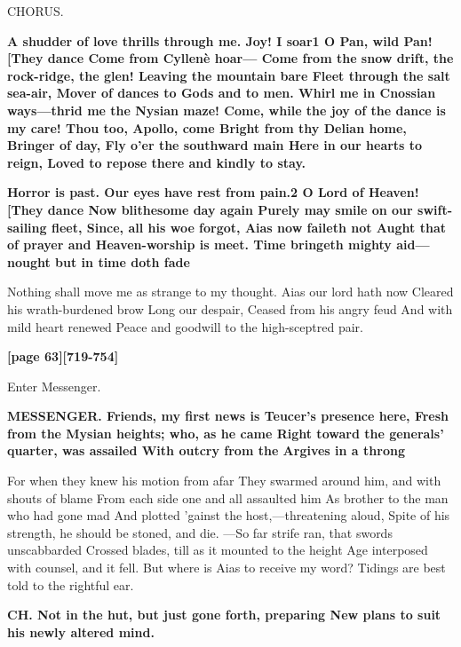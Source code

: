 \documentclass[11pt,letter]{book}
\begin{document}
\par  CHORUS.

\par \textbf{A shudder of love thrills through me. Joy! I soar1 O Pan, wild Pan![They dance Come from Cyllenè hoar— Come from the snow drift, the rock-ridge, the glen! Leaving the mountain bare Fleet through the salt sea-air, Mover of dances to Gods and to men. Whirl me in Cnossian ways—thrid me the Nysian maze! Come, while the joy of the dance is my care! Thou too, Apollo, come Bright from thy Delian home, Bringer of day, Fly o’er the southward main Here in our hearts to reign, Loved to repose there and kindly to stay.}
\par 

\par \textbf{Horror is past. Our eyes have rest from pain.2 O Lord of Heaven![They dance Now blithesome day again Purely may smile on our swift-sailing fleet, Since, all his woe forgot, Aias now faileth not Aught that of prayer and Heaven-worship is meet. Time bringeth mighty aid—nought but in time doth fade}
\par   Nothing shall move me as strange to my thought. Aias our lord hath now Cleared his wrath-burdened brow Long our despair, Ceased from his angry feud And with mild heart renewed Peace and goodwill to the high-sceptred pair.

\par \textbf{[page 63][719-754]}
\par 

\par  Enter Messenger.

\par \textbf{MESSENGER. Friends, my first news is Teucer’s presence here, Fresh from the Mysian heights; who, as he came Right toward the generals’ quarter, was assailed With outcry from the Argives in a throng}
\par   For when they knew his motion from afar They swarmed around him, and with shouts of blame From each side one and all assaulted him As brother to the man who had gone mad And plotted ’gainst the host,—threatening aloud, Spite of his strength, he should be stoned, and die. —So far strife ran, that swords unscabbarded Crossed blades, till as it mounted to the height Age interposed with counsel, and it fell. But where is Aias to receive my word? Tidings are best told to the rightful ear.

\par \textbf{CH. Not in the hut, but just gone forth, preparing New plans to suit his newly altered mind.}
\par 
\end{document}
